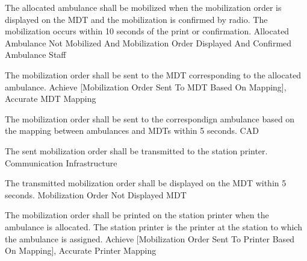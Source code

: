   \startkaosspec
  	 {The allocated ambulance shall be mobilized when the mobilization order is displayed on the MDT and the mobilization is confirmed by radio. The mobilization occurs within 10 seconds of the print or confirmation.}
  	 {Allocated Ambulance Not Mobilized And Mobilization Order Displayed And Confirmed}
  	 {Ambulance Staff}
  \stopkaosspec
  
  
    {}
    
  \startkaosspec
  	 {The mobilization order shall be sent to the MDT corresponding to the allocated ambulance.}
  	 {Achieve [Mobilization Order Sent To MDT Based On Mapping], Accurate MDT Mapping}
  \stopkaosspec

  \startkaosspec
  	 {The mobilization order shall be sent to the correspondign ambulance based on the mapping between ambulances and MDTs within 5 seconds.}
  	 {CAD}
  \stopkaosspec

  \startkaosspec
  	 {The sent mobilization order shall be transmitted to the station printer.}
  	 {Communication Infrastructure}
  \stopkaosspec

  \startkaosspec
  	 {The transmitted mobilization order shall be displayed on the MDT within 5 seconds.}
  	 {Mobilization Order Not Displayed}
  	 {MDT}
  \stopkaosspec
  
  
    {}

  \startkaosspec
  	 {The mobilization order shall be printed on the station printer when the ambulance is allocated. The station printer is the printer at the station to which the ambulance is assigned.}
  	 {Achieve [Mobilization Order Sent To Printer Based On Mapping], Accurate Printer Mapping}
  \stopkaosspec

